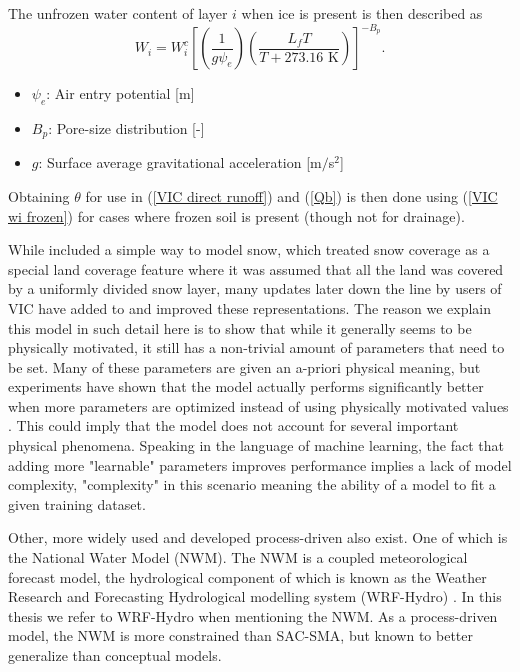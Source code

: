 The unfrozen  water content of layer $i$ when ice is present is then described as 
\begin{equation}
    W_i = W_i^c \left[ \left( \frac{1}{g \psi_e} \right) \left( \frac{L_fT}{T+273.16
    \text{ K}}  \right) \right]^{-B_p}. \label{VIC wi frozen}
\end{equation}

\begin{itemize}
    \item $\psi_e$: Air entry potential [m]
    \item $B_p$: Pore-size distribution [-]
    \item $g$: Surface average gravitational acceleration [m$/$s$^2$]
\end{itemize}
Obtaining $\theta$ for use in (\ref{VIC direct runoff}) and (\ref{Qb}) is then done 
using (\ref{VIC wi frozen}) for cases where frozen soil is present (though not for 
drainage). 

While \citet{VIC} included a simple way to model snow, which treated snow coverage as 
a special land coverage feature where it was assumed that all the land was covered 
by a uniformly divided snow layer, many updates later down the line by users of VIC 
have added to and improved these representations. 
The reason we explain this model in such detail here is to show that while it 
generally seems to be physically motivated, it still has a non-trivial amount of 
parameters that need to be set. Many of these parameters are given an a-priori 
physical meaning, but experiments have shown that the model actually performs 
significantly better when more parameters are optimized instead of using physically 
motivated values \citep{VICbench, BiasVarianceVIC}. This could imply that the model does not account 
for several important physical phenomena.
Speaking in the language of machine learning, the fact that adding more "learnable" 
parameters improves performance implies a lack of model complexity, "complexity" in 
this scenario meaning the ability of a model to fit a given training dataset.

Other, more widely used and developed process-driven also exist. One of which is 
the National Water Model (NWM). The NWM is a coupled meteorological forecast model, 
the hydrological component of which is known as the Weather Research and Forecasting 
Hydrological modelling system (WRF-Hydro) \citep{WRF-hydro-original, WFR-hydro-manual}. 
In this thesis we refer to WRF-Hydro when mentioning the NWM.
As a process-driven model, the NWM is more constrained 
than SAC-SMA, but known to better generalize than conceptual models.

